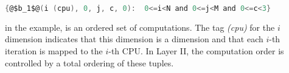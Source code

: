 \begin{lstlisting}[language=C,escapechar=@,numbers=none]
{@$b_1$@(i (cpu), 0, j, c, 0):  0<=i<N and 0<=j<M and 0<=c<3}
\end{lstlisting}

\noindent in the example, is an ordered set of computations.
The tag \emph{(cpu)} for the $i$ dimension indicates that this dimension is a \processor dimension and that each $i$-th iteration is mapped to the $i$-th CPU.  In Layer II, the computation order is controlled by a total ordering of these tuples.






